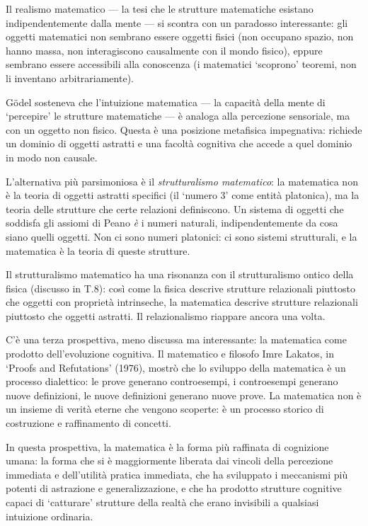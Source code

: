 \documentclass[12pt,a4paper,openany]{book}
\newcommand{\sezione}[1]{\vspace{1.2em}{\large\bfseries #1}\vspace{0.5em}\par}
\begin{document}
\sezione{Il realismo matematico e i suoi paradossi}

Il realismo matematico --- la tesi che le strutture matematiche esistano indipendentemente dalla mente --- si scontra con un paradosso interessante: gli oggetti matematici non sembrano essere oggetti fisici (non occupano spazio, non hanno massa, non interagiscono causalmente con il mondo fisico), eppure sembrano essere accessibili alla conoscenza (i matematici `scoprono' teoremi, non li inventano arbitrariamente).

Gödel sosteneva che l'intuizione matematica --- la capacità della mente di `percepire' le strutture matematiche --- è analoga alla percezione sensoriale, ma con un oggetto non fisico. Questa è una posizione metafisica impegnativa: richiede un dominio di oggetti astratti e una facoltà cognitiva che accede a quel dominio in modo non causale.

L'alternativa più parsimoniosa è il \textit{strutturalismo matematico}: la matematica non è la teoria di oggetti astratti specifici (il `numero 3' come entità platonica), ma la teoria delle strutture che certe relazioni definiscono. Un sistema di oggetti che soddisfa gli assiomi di Peano \textit{è} i numeri naturali, indipendentemente da cosa siano quelli oggetti. Non ci sono numeri platonici: ci sono sistemi strutturali, e la matematica è la teoria di queste strutture.

Il strutturalismo matematico ha una risonanza con il strutturalismo ontico della fisica (discusso in T.8): così come la fisica descrive strutture relazionali piuttosto che oggetti con proprietà intrinseche, la matematica descrive strutture relazionali piuttosto che oggetti astratti. Il relazionalismo riappare ancora una volta.

\sezione{La matematica come evoluzione cognitiva}

C'è una terza prospettiva, meno discussa ma interessante: la matematica come prodotto dell'evoluzione cognitiva. Il matematico e filosofo Imre Lakatos, in `Proofs and Refutations' (1976), mostrò che lo sviluppo della matematica è un processo dialettico: le prove generano controesempi, i controesempi generano nuove definizioni, le nuove definizioni generano nuove prove. La matematica non è un insieme di verità eterne che vengono scoperte: è un processo storico di costruzione e raffinamento di concetti.

In questa prospettiva, la matematica è la forma più raffinata di cognizione umana: la forma che si è maggiormente liberata dai vincoli della percezione immediata e dell'utilità pratica immediata, che ha sviluppato i meccanismi più potenti di astrazione e generalizzazione, e che ha prodotto strutture cognitive capaci di `catturare' strutture della realtà che erano invisibili a qualsiasi intuizione ordinaria.
\end{document}
